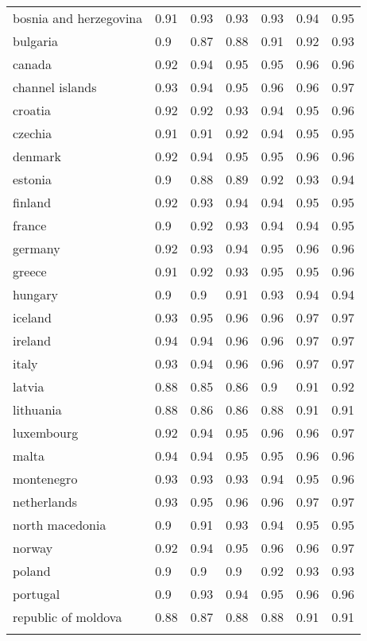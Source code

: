 \begin{longtable}[t]{lllllll}
bosnia and herzegovina & 0.91 & 0.93 & 0.93 & 0.93 & 0.94 & 0.95\\
bulgaria & 0.9 & 0.87 & 0.88 & 0.91 & 0.92 & 0.93\\
\addlinespace
canada & 0.92 & 0.94 & 0.95 & 0.95 & 0.96 & 0.96\\
channel islands & 0.93 & 0.94 & 0.95 & 0.96 & 0.96 & 0.97\\
croatia & 0.92 & 0.92 & 0.93 & 0.94 & 0.95 & 0.96\\
czechia & 0.91 & 0.91 & 0.92 & 0.94 & 0.95 & 0.95\\
denmark & 0.92 & 0.94 & 0.95 & 0.95 & 0.96 & 0.96\\
\addlinespace
estonia & 0.9 & 0.88 & 0.89 & 0.92 & 0.93 & 0.94\\
finland & 0.92 & 0.93 & 0.94 & 0.94 & 0.95 & 0.95\\
france & 0.9 & 0.92 & 0.93 & 0.94 & 0.94 & 0.95\\
germany & 0.92 & 0.93 & 0.94 & 0.95 & 0.96 & 0.96\\
greece & 0.91 & 0.92 & 0.93 & 0.95 & 0.95 & 0.96\\
\addlinespace
hungary & 0.9 & 0.9 & 0.91 & 0.93 & 0.94 & 0.94\\
iceland & 0.93 & 0.95 & 0.96 & 0.96 & 0.97 & 0.97\\
ireland & 0.94 & 0.94 & 0.96 & 0.96 & 0.97 & 0.97\\
italy & 0.93 & 0.94 & 0.96 & 0.96 & 0.97 & 0.97\\
latvia & 0.88 & 0.85 & 0.86 & 0.9 & 0.91 & 0.92\\
\addlinespace
lithuania & 0.88 & 0.86 & 0.86 & 0.88 & 0.91 & 0.91\\
luxembourg & 0.92 & 0.94 & 0.95 & 0.96 & 0.96 & 0.97\\
malta & 0.94 & 0.94 & 0.95 & 0.95 & 0.96 & 0.96\\
montenegro & 0.93 & 0.93 & 0.93 & 0.94 & 0.95 & 0.96\\
netherlands & 0.93 & 0.95 & 0.96 & 0.96 & 0.97 & 0.97\\
\addlinespace
north macedonia & 0.9 & 0.91 & 0.93 & 0.94 & 0.95 & 0.95\\
norway & 0.92 & 0.94 & 0.95 & 0.96 & 0.96 & 0.97\\
poland & 0.9 & 0.9 & 0.9 & 0.92 & 0.93 & 0.93\\
portugal & 0.9 & 0.93 & 0.94 & 0.95 & 0.96 & 0.96\\
republic of moldova & 0.88 & 0.87 & 0.88 & 0.88 & 0.91 & 0.91\\
\addlinespace

\end{longtable}
